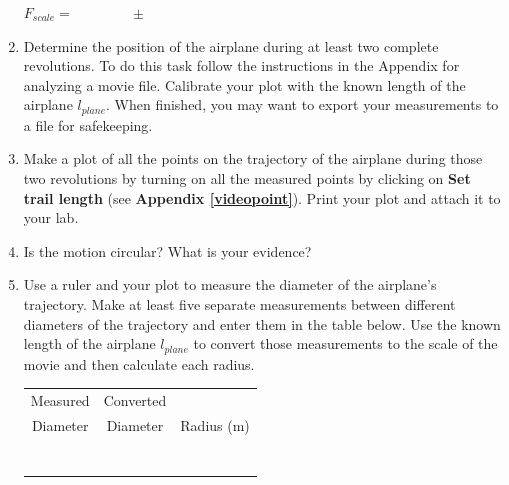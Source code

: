 \begin{enumerate}
\hspace{0.5in} $F_{scale} = \qquad\qquad \pm$

\vspace{5mm}

\item Determine the position of the airplane during at least two complete revolutions. To
do this task follow the instructions in the Appendix
for analyzing a movie file.
Calibrate your plot with the known length of the airplane $l_{plane}$.
When finished, you may want to export your measurements to a file for safekeeping.

\item Make a plot of all the points on the trajectory of the airplane during those two  revolutions  
by turning on all the measured points by clicking on {\bf Set trail length} (see {\bf Appendix \ref{videopoint}}).
Print your plot and attach it to your lab.

\item Is the motion circular? What is your evidence?
\vspace{10mm}

\item Use a ruler and your plot to measure the diameter of the airplane's trajectory.
Make at least five separate measurements between different diameters of the trajectory
and enter them in the table below.
Use the known length of the airplane $l_{plane}$ to convert those measurements to the scale of
the movie and then calculate each radius.

\begin{table}[h!]
\begin{center}
\begin{tabular}{|c|c|c|} \hline
Measured  &  Converted  &            \\
Diameter  &  Diameter   & Radius (m) \\ \hline
          &             &            \\
          &             &            \\
          &             &            \\
          &             &            \\
          &             &            \\
          &             &            \\
          &             &            \\ \hline
\end{tabular}
\end{center}
\end{table}


\end{enumerate}
